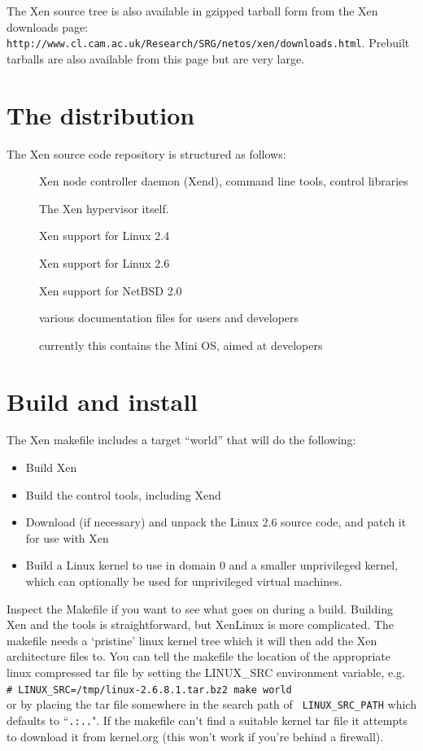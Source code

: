 \documentclass[11pt,twoside,final,openright]{xenstyle}
\begin{document}
The Xen source tree is also available in gzipped tarball form from the
Xen downloads page:\\
{\tt http://www.cl.cam.ac.uk/Research/SRG/netos/xen/downloads.html}.
Prebuilt tarballs are also available from this page but are very large.

\section{The distribution}

The Xen source code repository is structured as follows:

\begin{description}
\item[] Xen node controller daemon (Xend), command line tools, 
  control libraries
\item[] The Xen hypervisor itself.
\item[] Xen support for Linux 2.4
\item[] Xen support for Linux 2.6
\item[] Xen support for NetBSD 2.0
\item[] various documentation files for users and developers
\item[] currently this contains the Mini OS, aimed at developers
\end{description}

\section{Build and install}

The Xen makefile includes a target ``world'' that will do the
following:

\begin{itemize}
\item Build Xen
\item Build the control tools, including Xend
\item Download (if necessary) and unpack the Linux 2.6 source code,
      and patch it for use with Xen
\item Build a Linux kernel to use in domain 0 and a smaller
      unprivileged kernel, which can optionally be used for
      unprivileged virtual machines.
\end{itemize}

Inspect the Makefile if you want to see what goes on during a build.
Building Xen and the tools is straightforward, but XenLinux is more
complicated.  The makefile needs a `pristine' linux kernel tree which
it will then add the Xen architecture files to.  You can tell the
makefile the location of the appropriate linux compressed tar file by
setting the LINUX\_SRC environment variable, e.g. \\
\verb!# LINUX_SRC=/tmp/linux-2.6.8.1.tar.bz2 make world! \\ or by
placing the tar file somewhere in the search path of {\tt
LINUX\_SRC\_PATH} which defaults to ``{\tt .:..}".  If the makefile
can't find a suitable kernel tar file it attempts to download it from
kernel.org (this won't work if you're behind a firewall).
\end{document}
